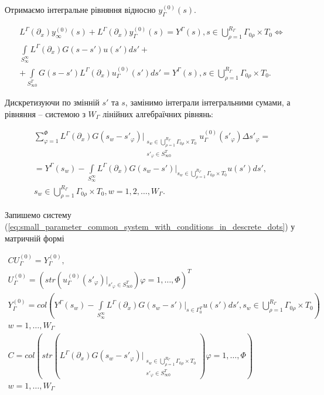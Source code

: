 Отримаємо інтегральне рівняння відносно $y^{(0)}_{\Gamma}(s)$.

\begin{gather*}
L^{\Gamma}(\partial_{x})y^{(0)}_{\infty}(s) + L^{\Gamma}(\partial_{x})y^{(0)}_{\Gamma}(s) = Y^{\Gamma}(s),
s\in\bigcup\limits_{\rho=1}^{R_{\Gamma}} \Gamma_{0\rho}\times T_{0} \Leftrightarrow\\
    \int\limits_{S^{\infty}_{\infty}}L^{\Gamma}(\partial_{x})G(s-s')u(s')ds' +\\
    + \int\limits_{S^{T}_{\infty 0}}G(s-s')L^{\Gamma}(\partial_{x})u^{(0)}_{\Gamma}(s')ds' = Y^{\Gamma}(s),
s\in\bigcup\limits_{\rho=1}^{R_{\Gamma}} \Gamma_{0\rho}\times T_{0}.
\end{gather*}

Дискретизуючи по змінній $s'$ та $s$, замінимо інтеграли інтегральними сумами, а  рівняння -- системою з $W_{\Gamma}$
лінійних алгебраїчних рівнянь:

\begin{equation}
    \label{eq:small_parameter_common_system_with_conditions_in_descrete_dots}
    \begin{alignedat}{2}
    \sum_{\varphi=1}^{\Phi} L^{\Gamma}(\partial_{x})G(s_{w} - s'_{\varphi})
    \bigg|_{\substack{
    s_{w}\in
    \bigcup\limits_{\rho=1}^{R_{\Gamma}} \Gamma_{0\rho}\times T_{0}\\
    s'_{\varphi}\in S^{T}_{\infty 0}
    }
    }
    u^{(0)}_{\Gamma}(s'_{\varphi})\Delta s'_{\varphi} =\\
    = Y^{\Gamma}(s_{w})-\int\limits_{S^{\infty}_{\infty}} L^{\Gamma}(\partial_{x})G(s_{w}-s')
    \bigg|_{s_{w}\in\bigcup\limits_{\rho=1}^{R_{\Gamma}} \Gamma_{0\rho}\times T_{0}}u(s')ds',\\
    s_{w}\in\bigcup\limits_{\rho=1}^{R_{\Gamma}} \Gamma_{0\rho}\times T_{0}, w=1,2,\dots,W_{\Gamma}.
    \end{alignedat}
\end{equation}

Запишемо систему (\ref{eq:small_parameter_common_system_with_conditions_in_descrete_dots}) у матричній формі

\begin{gather*}
    CU^{(0)}_{\Gamma} = Y^{(0)}_{\Gamma},\\
    U^{(0)}_{\Gamma}=\left(str\left( u^{(0)}_{\Gamma}
    (s'_{\varphi})\bigg|_{s'_{\varphi}\in S^{T}_{\infty 0}} \right) \varphi=1,\dots,\Phi \right)^{T}\\
    Y^{(0)}_{\Gamma}=col\left(Y^{\Gamma}(s_{w})
    -\int\limits_{S^{\infty}_{\infty}}L^{\Gamma}(\partial_{x})G(s_{w}-s')\bigg|_{s\in\Gamma^{T}_{0}}u(s')ds',
    s_{w}\in\bigcup\limits_{\rho=1}^{R_{\Gamma}} \Gamma_{0\rho}\times T_{0}
    \right)\\
    w=1,\dots,W_{\Gamma}\\
    C=col\left( str\left(L^{\Gamma}(\partial_{x}) G(s_{w}-s'_{\varphi})
    \bigg|_{\substack{
        s_{w}\in
        \bigcup\limits_{\rho=1}^{R_{\Gamma}} \Gamma_{0\rho}\times T_{0}\\
        s'_{\varphi}\in S^{T}_{\infty 0}
    }}
    \right)\varphi=1,\dots,\Phi \right)\\
    w=1,\dots,W_{\Gamma}
\end{gather*}

